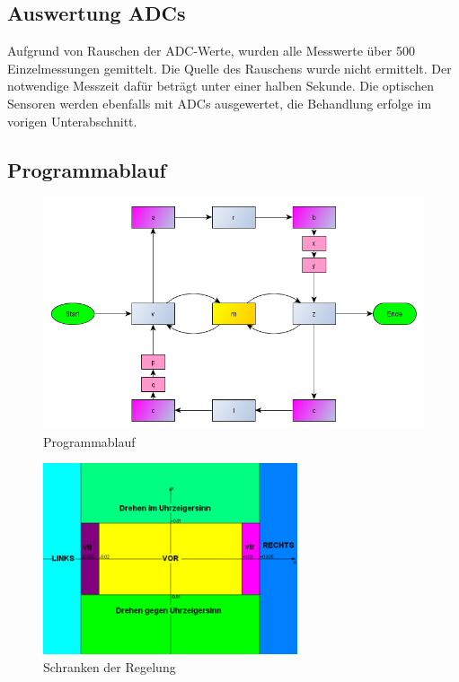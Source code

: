 \documentclass[a4paper,bibtotoc,oneside]{scrbook}
\begin{document}
\subsection{Auswertung ADCs}\thispagestyle{empty}
Aufgrund von Rauschen der ADC-Werte, wurden alle Messwerte über 500 Einzelmessungen gemittelt. Die Quelle des Rauschens wurde nicht ermittelt. Der notwendige Messzeit dafür beträgt unter einer halben Sekunde. Die optischen Sensoren werden ebenfalls mit ADCs ausgewertet, die Behandlung erfolge im vorigen Unterabschnitt. 

\subsection{Programmablauf}\thispagestyle{empty}

\begin{figure}[htbp]
\centering
\includegraphics[width=150mm]{img/ablauf2.png}
\caption[Programmablauf]{Programmablauf}\label{abl}
\end{figure}

\begin{figure}[htbp]
\centering
\includegraphics[width=75mm]{img/schranken.png}
\caption[Schranken der Regelung]{Schranken der Regelung}\label{schr}
\end{figure}
\end{document}
